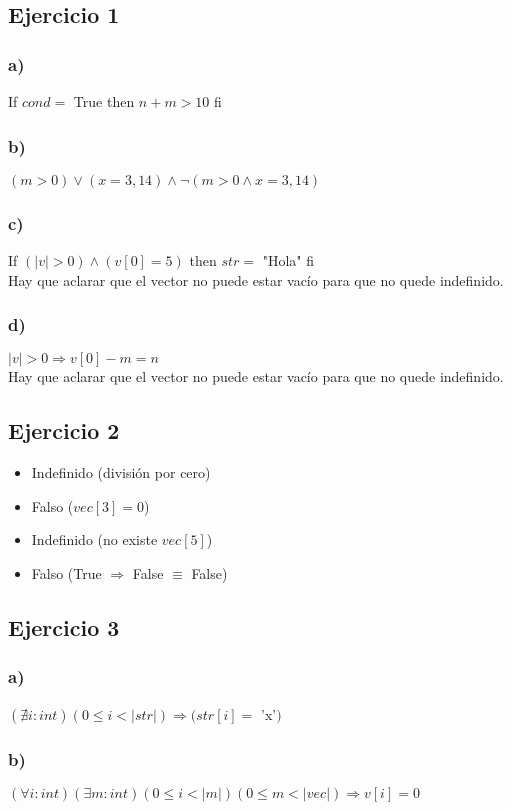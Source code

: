 \documentclass[12 pt]{article}
\begin{document}
\subsection*{Ejercicio 1}
    \subsubsection*{a)}
        If $cond =$ True then $n + m > 10$ fi
    \subsubsection*{b)}
        $(m > 0) \vee (x = 3,14) \wedge \neg (m > 0 \wedge x = 3,14) $
    \subsubsection*{c)}
        If $(|v| > 0) \wedge (v[0] = 5)$ then $str =$ "Hola" fi \\
        Hay que aclarar que el vector no puede estar vacío para que no quede indefinido.
    \subsubsection*{d)}
        $|v| > 0 \Rightarrow v[0] - m = n$ \\
        Hay que aclarar que el vector no puede estar vacío para que no quede indefinido.

\subsection*{Ejercicio 2}
    \begin{itemize}
        \item Indefinido (división por cero)
        \item Falso ($vec[3] = 0$)
        \item Indefinido (no existe $vec[5]$)
        \item Falso (True $\Rightarrow$ False $\equiv$ False)
    \end{itemize}

\subsection*{Ejercicio 3}
    \subsubsection*{a)}
        $(\nexists i:int)(0 \leq i < |str|) \Rightarrow (str[i] =$ 'x'$)$
    \subsubsection*{b)}
        $(\forall i:int)(\exists m:int)(0 \leq i < |m|)(0 \leq m < |vec|) \Rightarrow v[i] = 0$
\end{document}
